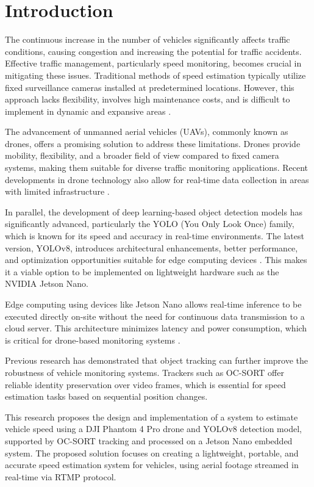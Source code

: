 \section{Introduction}
\label{sec:introduction}


The continuous increase in the number of vehicles significantly affects traffic conditions, causing congestion and increasing the potential for traffic accidents. Effective traffic management, particularly speed monitoring, becomes crucial in mitigating these issues. Traditional methods of speed estimation typically utilize fixed surveillance cameras installed at predetermined locations. However, this approach lacks flexibility, involves high maintenance costs, and is difficult to implement in dynamic and expansive areas \cite{ref1}.

The advancement of unmanned aerial vehicles (UAVs), commonly known as drones, offers a promising solution to address these limitations. Drones provide mobility, flexibility, and a broader field of view compared to fixed camera systems, making them suitable for diverse traffic monitoring applications. Recent developments in drone technology also allow for real-time data collection in areas with limited infrastructure \cite{ref1}.

In parallel, the development of deep learning-based object detection models has significantly advanced, particularly the YOLO (You Only Look Once) family, which is known for its speed and accuracy in real-time environments. The latest version, YOLOv8, introduces architectural enhancements, better performance, and optimization opportunities suitable for edge computing devices \cite{ref3}. This makes it a viable option to be implemented on lightweight hardware such as the NVIDIA Jetson Nano.

Edge computing using devices like Jetson Nano allows real-time inference to be executed directly on-site without the need for continuous data transmission to a cloud server. This architecture minimizes latency and power consumption, which is critical for drone-based monitoring systems \cite{ref5}.

Previous research has demonstrated that object tracking can further improve the robustness of vehicle monitoring systems. Trackers such as OC-SORT offer reliable identity preservation over video frames, which is essential for speed estimation tasks based on sequential position changes.

This research proposes the design and implementation of a system to estimate vehicle speed using a DJI Phantom 4 Pro drone and YOLOv8 detection model, supported by OC-SORT tracking and processed on a Jetson Nano embedded system. The proposed solution focuses on creating a lightweight, portable, and accurate speed estimation system for vehicles, using aerial footage streamed in real-time via RTMP protocol.

